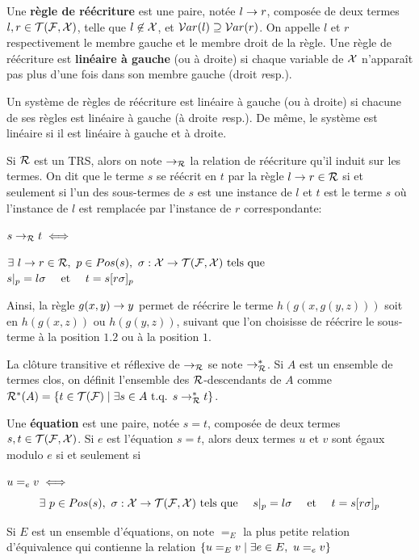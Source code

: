 \begin{definition}
  Une \textbf{règle de réécriture} est une paire, notée $l \rightarrow r$, composée de deux termes $l, r \in \mathcal{T(F, X)}$,
  telle que $l \not \in \mathcal X$, et $\mathcal{ V}ar(l) \supseteq \mathcal{ V}ar(r)$. 
  On appelle $l$ et $r$ respectivement le membre gauche et le membre droit de la règle.
  Une règle de réécriture est \textbf{linéaire à gauche} (ou à droite) si chaque variable de $\mathcal X$ 
  n'apparaît pas plus d'une fois dans son membre gauche (droit {\textit resp.}).
\end{definition}

Un système de règles de réécriture est linéaire à gauche (ou à droite) si chacune 
de ses règles est linéaire à gauche (à droite {\textit resp.}). De même, le système est 
linéaire si il est linéaire à gauche et à droite.

\begin{definition}
  Si $\mathcal R$ est un TRS, alors on note $\rightarrow_{\mathcal R}$ la relation de réécriture qu'il induit sur les termes.
  On dit que le terme $s$ se réécrit en $t$ par la règle $l \rightarrow r \in \mathcal R$ si et seulement si l'un des sous-termes de $s$
  est une instance de $l$ et $t$ est le terme $s$ où l'instance de $l$ est remplacée par l'instance de $r$ correspondante:

  \noindent $s \rightarrow_\mathcal R t \; \Longleftrightarrow \;$
  \begin{flushright}
    $\exists\ l \rw r \in \R,\ p \in Pos(s),\ \sigma: \X \rw \TFX \textrm{ tels que }\quad \quad \quad$
    $s|_p = l\sigma \quad \mbox{ et } \quad  t = s[r\sigma]_p$
  \end{flushright}
\end{definition}
Ainsi, la règle $g(x, y) \rightarrow y$ permet de réécrire le terme $h(g(x, g(y, z)))$ 
soit en $h(g(x, z))$ ou $h(g(y, z))$, suivant que l'on choisisse de réécrire le sous-terme
à la position $1.2$ ou à la position $1$.

La clôture transitive et réflexive de $\rightarrow_\mathcal R$ se note $\rightarrow^*_{\mathcal R}$.
Si $A$ est un ensemble de termes clos, on définit l'ensemble des $\mathcal R$-descendants 
de $A$ comme $\mathcal R^*(A) = \{t \in \mathcal{T(F)} \; | \; \exists s \in A \mbox{ t.q. } s \rightarrow^*_{\mathcal R} t \}$.

\begin{definition}
  Une \textbf{équation} est une paire, notée $s = t$, composée de deux termes $s, t \in \mathcal{T(F, X)}$.
  Si $e$ est l'équation $s = t$, alors deux termes $u$ et $v$ sont égaux modulo $e$ si et seulement si
  
  \noindent $u =_e v \; \Longleftrightarrow \;$\\
  \[\exists\ p \in Pos(s),\ \sigma: \mathcal X \rightarrow \mathcal{T(F, X)} \textrm{ tels que } \quad s|_p = l\sigma \quad \mbox{ et } \quad  t = s[r\sigma]_p\]
  
  Si $E$ est un ensemble d'équations, on note $=_E$ la plus petite relation d'équivalence qui contienne la relation
  $\{ u =_E v \; | \; \exists e \in E,\ u =_e v\}$
\end{definition}


